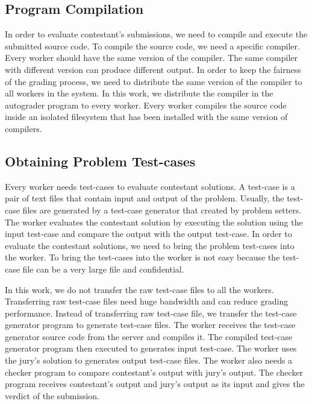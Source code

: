 \documentclass[conference,a4paper]{IEEEtran}
\begin{document}
\subsection{Program Compilation}

In order to evaluate contestant's submissions, we need to compile and execute the submitted source code. To compile the source code, we need a specific compiler. Every worker should have the same version of the compiler. The same compiler with different version can produce different output. In order to keep the fairness of the grading process, we need to distribute the same version of the compiler to all workers in the system. In this work, we distribute the compiler in the autograder program to every worker. Every worker compiles the source code inside an isolated filesystem that has been installed with the same version of compilers.

\subsection{Obtaining Problem Test-cases}

Every worker needs test-cases to evaluate contestant solutions. A test-case is a pair of text files that contain input and output of the problem. Usually, the test-case files are generated by a test-case generator that created by problem setters. The worker evaluates the contestant solution by executing the solution using the input test-case and compare the output with the output test-case. In order to evaluate the contestant solutions, we need to bring the problem test-cases into the worker. To bring the test-cases into the worker is not easy because the test-case file can be a very large file and confidential.

In this work, we do not transfer the raw test-case files to all the workers. Transferring raw test-case files need huge bandwidth and can reduce grading performance. Instead of transferring raw test-case file, we transfer the test-case generator program to generate test-case files. The worker receives the test-case generator source code from the server and compiles it. The compiled test-case generator program then executed to generates input test-case. The worker uses the jury's solution to generates output test-case files. The worker also needs a checker program to compare contestant's output with jury's output. The checker program receives contestant's output and jury's output as its input and gives the verdict of the submission.
\end{document}
